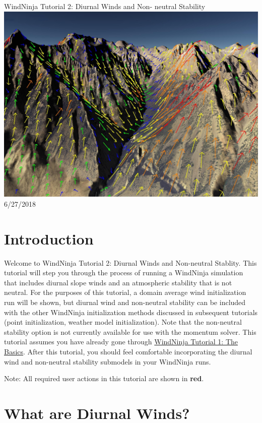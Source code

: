 \documentclass[12pt]{article}
\begin{document}
\begin{titlepage}
    \centering
    {\Huge
       WindNinja Tutorial 2: Diurnal Winds and Non-				neutral Stability
    }    
    \vfill
    \includegraphics[scale=0.2]								{imgs/title_fig.jpg}
    \vfill
  	{\Huge
	  6/27/2018 %
  	}
    \vfill
\end{titlepage}

\section*{Introduction}
Welcome to WindNinja Tutorial 2: Diurnal Winds and Non-neutral Stablity.  This tutorial will step you through the process of running a WindNinja simulation that includes diurnal slope winds and an atmospheric stability that is not neutral.  For the purposes of this tutorial, a domain average wind initialization run will be shown, but diurnal wind and non-neutral stability can be included with the other WindNinja initialization methods discussed in subsequent tutorials (point initialization, weather model initialization).  Note that the non-neutral stability option is not currently available for use with the momentum solver. This tutorial assumes you have already gone through \href{http://firelab.github.io/windninja/pdf/WindNinja_tutorial1.pdf}{WindNinja Tutorial 1: The Basics}.  After this tutorial, you should feel comfortable incorporating the diurnal wind and non-neutral stability submodels in your WindNinja runs.

Note:  All required user actions in this tutorial are shown in  \textbf{\color{red} red}.

\section*{What are Diurnal Winds?}
\end{document}
